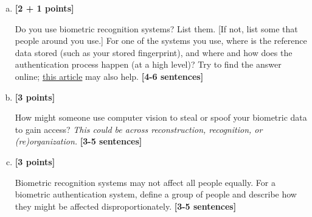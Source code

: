 \documentclass[11pt]{article}
\begin{document}
\begin{enumerate}[(a)]
    \item \textbf{[2 + 1 points]}
    \begin{tcolorbox}[colback=orange!5!white,colframe=orange!75!black]
    Do you use biometric recognition systems? List them. [If not, list some that people around you use.]
    For one of the systems you use, where is the reference data stored (such as your stored fingerprint), and where and how does the authentication process happen (at a high level)? 
    Try to find the answer online; \href{https://ievoreader.com/how-biometric-data-is-stored/}{this article} may also help. \textbf{[4-6 sentences]}
    \end{tcolorbox}
    

    \item
    \textbf{[3 points]}
    \begin{tcolorbox}[colback=orange!5!white,colframe=orange!75!black]
    How might someone use computer vision to steal or spoof your biometric data to gain access? \emph{This could be across reconstruction, recognition, or (re)organization.} \textbf{[3-5 sentences]}
    \end{tcolorbox}



    \pagebreak
    \item
    \textbf{[3 points]}
    \begin{tcolorbox}[colback=orange!5!white,colframe=orange!75!black]
    Biometric recognition systems may not affect all people equally. For a biometric authentication system, define a group of people and describe how they might be affected disproportionately. \textbf{[3-5 sentences]}
    \end{tcolorbox}
    

\end{enumerate}
\end{document}
